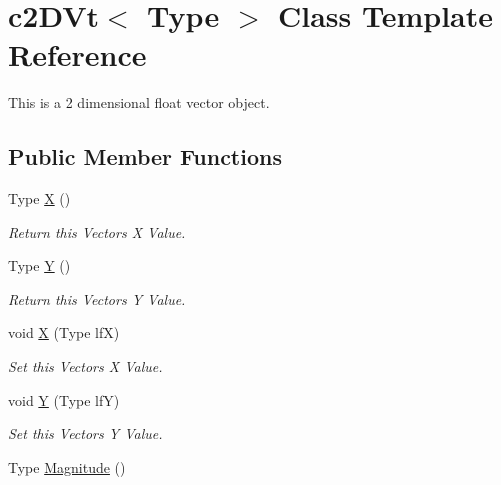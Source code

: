 \hypertarget{classc2_d_vt}{
\section{c2DVt$<$ Type $>$ Class Template Reference}
\label{classc2_d_vt}
}


This is a 2 dimensional float vector object.  


\subsection*{Public Member Functions}
\begin{DoxyCompactItemize}
\item 
\hypertarget{classc2_d_vt_ab3917acfda2531e83f428c5b1a2c3bba}{
Type \hyperlink{classc2_d_vt_ab3917acfda2531e83f428c5b1a2c3bba}{X} ()}
\label{classc2_d_vt_ab3917acfda2531e83f428c5b1a2c3bba}

\begin{DoxyCompactList}\small\item\em Return this Vectors X Value. \end{DoxyCompactList}\item 
\hypertarget{classc2_d_vt_af9fa70743cd79d35506ce1815ad2276b}{
Type \hyperlink{classc2_d_vt_af9fa70743cd79d35506ce1815ad2276b}{Y} ()}
\label{classc2_d_vt_af9fa70743cd79d35506ce1815ad2276b}

\begin{DoxyCompactList}\small\item\em Return this Vectors Y Value. \end{DoxyCompactList}\item 
\hypertarget{classc2_d_vt_abbc0653d3c4ee45bc1bf0249078f37dc}{
void \hyperlink{classc2_d_vt_abbc0653d3c4ee45bc1bf0249078f37dc}{X} (Type lfX)}
\label{classc2_d_vt_abbc0653d3c4ee45bc1bf0249078f37dc}

\begin{DoxyCompactList}\small\item\em Set this Vectors X Value. \end{DoxyCompactList}\item 
\hypertarget{classc2_d_vt_a59e52cad1a30d254c380cd033460259f}{
void \hyperlink{classc2_d_vt_a59e52cad1a30d254c380cd033460259f}{Y} (Type lfY)}
\label{classc2_d_vt_a59e52cad1a30d254c380cd033460259f}

\begin{DoxyCompactList}\small\item\em Set this Vectors Y Value. \end{DoxyCompactList}\item 
\hypertarget{classc2_d_vt_a29a0b1c44541a25774bad305a8b06135}{
Type \hyperlink{classc2_d_vt_a29a0b1c44541a25774bad305a8b06135}{Magnitude} ()}
\label{classc2_d_vt_a29a0b1c44541a25774bad305a8b06135}


\end{DoxyCompactItemize}
